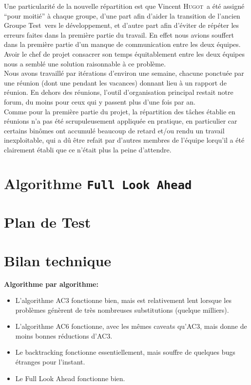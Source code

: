 \documentclass[a4paper,12pt]{article}
\def\familyname{\textsc}
\def\firstname#1{#1}
\def\groupmember#1#2{\firstname{#1} \familyname{#2}}
\def\mvin{\groupmember{Vincent}{Hugot}}
\def\grpt{Groupe Test}
\begin{document}
\noi Une particularité de la nouvelle répartition est que \mvin\ a
été assigné ``pour moitié'' à chaque groupe, d'une part
afin d'aider la transition de l'ancien \grpt\ vers le développement,
et d'autre part afin d'éviter de répéter les erreurs faites dans la première
partie du travail. En effet nous avions souffert dans la première partie
d'un manque de communication entre les deux équipes.
Avoir le chef de projet consacrer son temps équitablement
entre les deux équipes nous a semblé une solution raisonnable
à ce problème.\mk\\
%
Nous avons travaillé par itérations d'environ une semaine,
chacune ponctuée par une réunion (dont une pendant les vacances)
donnant lieu à un rapport de réunion.
En dehors des réunions, l'outil d'organisation
principal restait notre forum, du moins pour ceux
qui y passent plus d'une fois par an.\mk\\
%
Comme pour la première partie du projet, la répartition
des tâches établie en réunions n'a pas été scrupuleusement
appliquée en pratique, 
en particulier car certains binômes ont
accumulé beaucoup de retard et/ou rendu
un travail inexploitable, qui a dû être refait par 
d'autres membres de l'équipe lorqu'il a été clairement
établi que ce n'était plus la peine d'attendre.


\section{Algorithme \texttt{Full Look Ahead}}



\section{Plan de Test}


\section{Bilan technique}

\textbf{Algorithme par algorithme:}
\begin{itemize}
\item L'algorithme AC3 fonctionne bien, mais est relativement lent lorsque les problèmes 
génèrent de très nombreuses substitutions (quelque milliers).

\item L'algorithme AC6 fonctionne, avec les mêmes caveats qu'AC3, mais donne de moins bonnes
réductions d'AC3.

\item Le backtracking fonctionne essentiellement, mais souffre de quelques bugs étranges pour l'instant. 

\item Le Full Look Ahead fonctionne bien.
  
\end{itemize}
\end{document}

